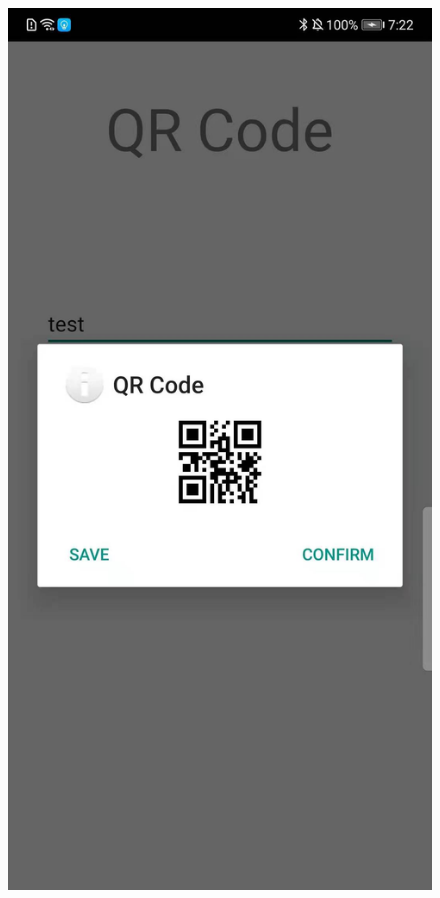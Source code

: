 \documentclass[12pt, a4paper]{article}
\theoremstyle{definition}
\begin{document}
\begin{figure}[htbp]
\begin{minipage}[t]{0.2\linewidth}
		\end{minipage}
		\begin{minipage}[t]{0.2\linewidth}
		\centering
		\includegraphics[width=\linewidth]{6-3.jpeg}

\end{minipage}
\end{figure}
\end{document}
